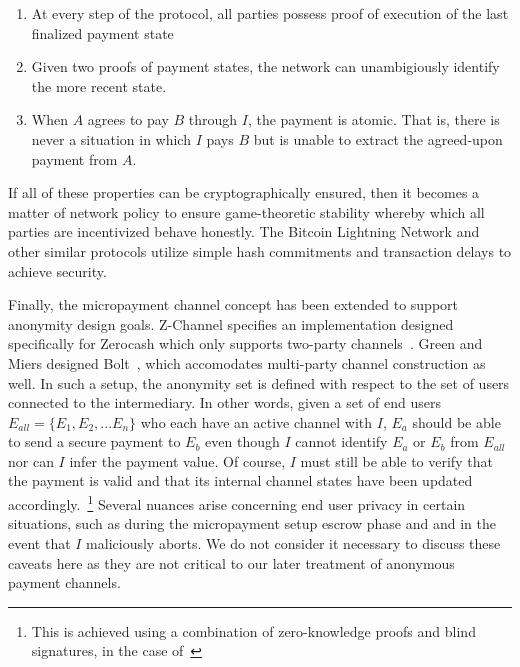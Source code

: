 \begin{enumerate}
\item At every step of the protocol, all parties possess proof of execution of
  the last finalized payment state
\item Given two proofs of payment states, the network can unambigiously identify
  the more recent state.
\item When $A$ agrees to pay $B$ through $I$, the payment is atomic. That is,
  there is never a situation in which $I$ pays $B$ but is unable to extract the
  agreed-upon payment from $A$.
\end{enumerate}

If all of these properties can be cryptographically ensured, then it becomes a
matter of network policy to ensure game-theoretic stability whereby which all
parties are incentivized behave honestly. The Bitcoin Lightning Network and
other similar protocols utilize simple hash commitments and transaction delays
to achieve security.

Finally, the micropayment channel concept has been extended to support anonymity
design goals. Z-Channel specifies an implementation designed specifically for
Zerocash which only supports two-party channels~\cite{zhang2017z}. Green and
Miers designed Bolt~\cite{green2017bolt}, which accomodates multi-party channel construction as
well. In such a setup, the anonymity set is defined with
respect to the set of users connected to the intermediary. In other words, given
a set of end users $E_{all} = \{E_1, E_2, ... E_n\}$ who each have an active
channel with $I$, $E_a$ should be able to send a secure payment to $E_b$ even
though $I$ cannot identify $E_a$ or $E_b$ from $E_{all}$ nor can $I$ infer the
payment value. Of course, $I$ must still be able to verify that the payment is
valid and that its internal channel states have been updated
accordingly.~\footnote{This is achieved using a combination of zero-knowledge
  proofs and blind signatures, in the case of~\cite{green2017bolt}} Several
nuances arise concerning end user privacy in certain situations, such as during
the micropayment setup escrow phase and and in the event that $I$ maliciously
aborts. We do not consider it necessary to discuss these caveats here as they
are not critical to our later treatment of anonymous payment channels.
